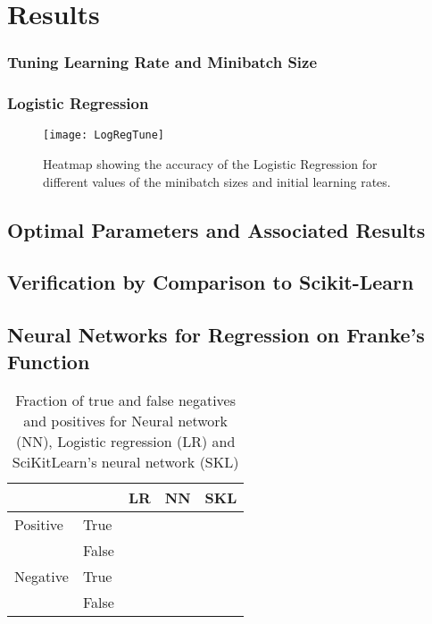 \section{Results}
\label{sec:results}

\subsubsection{Tuning Learning Rate and Minibatch Size}
\subsubsection*{Logistic Regression}
\begin{figure}[htbp]
	\centering
	\texttt{[image: LogRegTune]}
	\caption{Heatmap showing the accuracy of the Logistic Regression for different
    values of the minibatch sizes and initial learning rates.}
	\label{fig:TuneLogReg}
\end{figure}


\subsection*{Optimal Parameters and Associated Results}

\subsection{Verification by Comparison to Scikit-Learn}

\subsection{Neural Networks for Regression on Franke's Function}


\begin{table}[htbp]

\caption{Fraction of true and false negatives and positives for Neural network (NN), Logistic regression (LR) and SciKitLearn's neural network (SKL)}
	\begin{tabular}{l  l  r  r  r}
		 & & \textbf{LR} & \textbf{NN} & \textbf{SKL} \\
		 \hline
		Positive & True & & & \\
		 & False &  & & \\
		 \hline
		Negative & True & &  & \\
		& False & & & \\
	\end{tabular}
\label{tab:confusion}
\end{table}

\begin{figure}[htbp]
	\centering
	\caption{}
	\label{fig:}
\end{figure}
